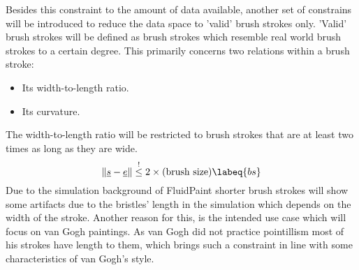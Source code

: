 Besides this constraint to the amount of data available, another set of constrains
will be introduced to reduce the data space to 'valid' brush strokes only.
'Valid' brush strokes will be defined as brush strokes which resemble real world
brush strokes to a certain degree.
This primarily concerns two relations within a brush stroke:
\begin{itemize}
    \item Its width-to-length ratio.
    \item Its curvature.
\end{itemize}

The width-to-length ratio will be restricted to brush strokes that are at least
two times as long as they are wide.
\begin{equation}
\norm{\vec{s} - \vec{e}} \overset{!}{\leq}  2 \times (\text{brush size}) \labeq{bs}
\end{equation}
Due to the simulation background of FluidPaint shorter brush strokes will show some
artifacts due to the bristles' length in the simulation which depends on the width
of the stroke.
Another reason for this, is the intended use case which will focus on van Gogh paintings.
As van Gogh did not practice pointillism most of his strokes have length to them,
which brings such a constraint in line with some characteristics of van Gogh's style.

